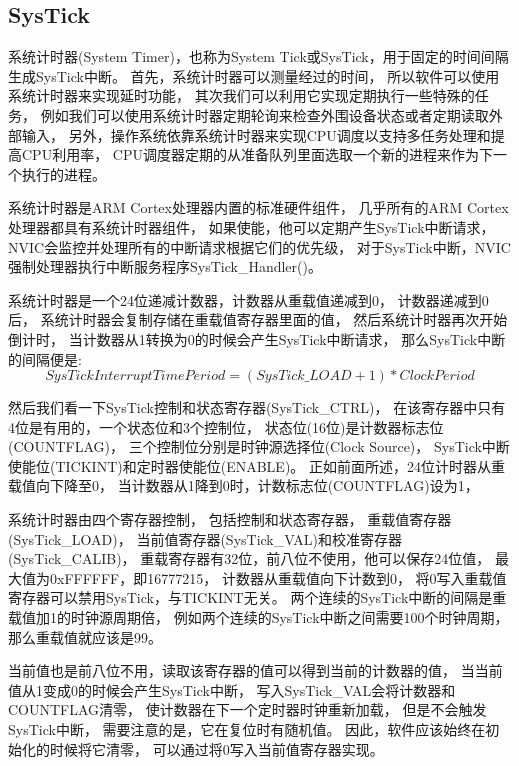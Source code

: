 \subsection{SysTick}
系统计时器(System Timer)，也称为System Tick或SysTick，用于固定的时间间隔生成SysTick中断。
首先，系统计时器可以测量经过的时间，
所以软件可以使用系统计时器来实现延时功能，
其次我们可以利用它实现定期执行一些特殊的任务，
例如我们可以使用系统计时器定期轮询来检查外围设备状态或者定期读取外部输入，
另外，操作系统依靠系统计时器来实现CPU调度以支持多任务处理和提高CPU利用率，
CPU调度器定期的从准备队列里面选取一个新的进程来作为下一个执行的进程。

系统计时器是ARM Cortex处理器内置的标准硬件组件，
几乎所有的ARM Cortex处理器都具有系统计时器组件，
如果使能，他可以定期产生SysTick中断请求，
NVIC会监控并处理所有的中断请求根据它们的优先级，
对于SysTick中断，NVIC强制处理器执行中断服务程序SysTick\_Handler()。

系统计时器是一个24位递减计数器，计数器从重载值递减到0，
计数器递减到0后，
系统计时器会复制存储在重载值寄存器里面的值，
然后系统计时器再次开始倒计时，
当计数器从1转换为0的时候会产生SysTick中断请求，
那么SysTick中断的间隔便是:
$$SysTick Interrupt  Time Period  = (SysTick\_LOAD + 1 ) * Clock Period$$

然后我们看一下SysTick控制和状态寄存器(SysTick\_CTRL)，
在该寄存器中只有4位是有用的，一个状态位和3个控制位，
状态位(16位)是计数器标志位(COUNTFLAG)，
三个控制位分别是时钟源选择位(Clock Source)，
SysTick中断使能位(TICKINT)和定时器使能位(ENABLE)。
正如前面所述，24位计时器从重载值向下降至0，
当计数器从1降到0时，计数标志位(COUNTFLAG)设为1，

系统计时器由四个寄存器控制，
包括控制和状态寄存器，
重载值寄存器(SysTick\_LOAD)，
当前值寄存器(SysTick\_VAL)和校准寄存器(SysTick\_CALIB)，
重载寄存器有32位，前八位不使用，他可以保存24位值，
最大值为0xFFFFFF，即16777215，
计数器从重载值向下计数到0，
将0写入重载值寄存器可以禁用SysTick，与TICKINT无关。
两个连续的SysTick中断的间隔是重载值加1的时钟源周期倍，
例如两个连续的SysTick中断之间需要100个时钟周期，
那么重载值就应该是99。

当前值也是前八位不用，读取该寄存器的值可以得到当前的计数器的值，
当当前值从1变成0的时候会产生SysTick中断，
写入SysTick\_VAL会将计数器和COUNTFLAG清零，
使计数器在下一个定时器时钟重新加载，
但是不会触发SysTick中断，
需要注意的是，它在复位时有随机值。
因此，软件应该始终在初始化的时候将它清零，
可以通过将0写入当前值寄存器实现。

